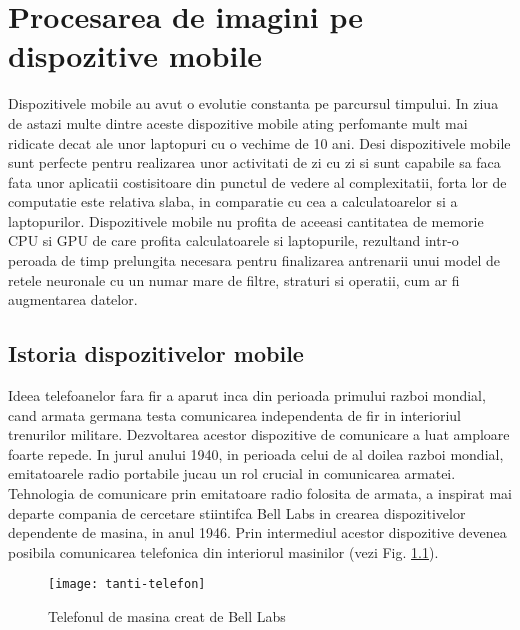 
\chapter{Procesarea de imagini pe dispozitive mobile}
	Dispozitivele mobile au avut o evolutie constanta pe parcursul timpului. In ziua de astazi multe dintre aceste dispozitive mobile ating perfomante mult mai ridicate decat ale unor laptopuri cu o vechime de 10 ani. 
	Desi dispozitivele mobile sunt perfecte pentru realizarea unor activitati de zi cu zi si sunt capabile sa faca fata unor aplicatii costisitoare din punctul de vedere al complexitatii, forta lor de computatie este relativa slaba, in comparatie cu cea a calculatoarelor si a laptopurilor. Dispozitivele mobile nu profita de aceeasi cantitatea de memorie CPU si GPU de care profita calculatoarele si laptopurile, rezultand intr-o peroada de timp prelungita necesara pentru finalizarea antrenarii unui model de retele neuronale cu un numar mare de filtre, straturi si operatii, cum ar fi augmentarea datelor.
	
	\section{Istoria dispozitivelor mobile}
	Ideea telefoanelor fara fir a aparut inca din perioada primului razboi mondial, cand armata germana testa comunicarea independenta de fir in interioriul trenurilor militare. Dezvoltarea acestor dispozitive de comunicare a luat amploare foarte repede. In jurul anului 1940, in perioada celui de al doilea razboi mondial, emitatoarele radio portabile jucau un rol crucial in comunicarea armatei.
	Tehnologia de comunicare prin emitatoare radio folosita de armata, a inspirat mai departe compania de cercetare stiintifca Bell Labs in crearea dispozitivelor dependente de masina, in anul 1946. Prin intermediul acestor dispozitive devenea posibila comunicarea telefonica din interiorul masinilor (vezi Fig. \ref{fig:tanti-telefon}).
	
	\begin{figure}[H]
		\texttt{[image: tanti-telefon]}  
		\caption{\label{fig:tanti-telefon} Telefonul de masina creat de Bell Labs
			\protect
			\footnotemark}
	\end{figure}
	
	
